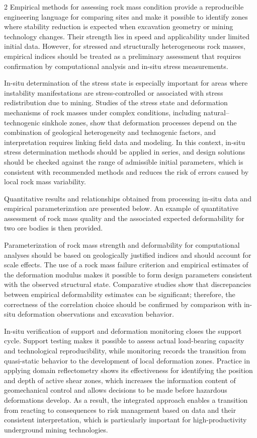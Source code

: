 \begin{multicols}{2}
Empirical methods for assessing rock mass condition provide a
reproducible engineering language for comparing sites and make it
possible to identify zones where stability reduction is expected when
excavation geometry or mining technology changes. Their strength lies in
speed and applicability under limited initial data. However, for
stressed and structurally heterogeneous rock masses, empirical indices
should be treated as a preliminary assessment that requires confirmation
by computational analysis and in-situ stress measurements.

In-situ determination of the stress state is especially important for
areas where instability manifestations are stress-controlled or
associated with stress redistribution due to mining. Studies of the
stress state and deformation mechanisms of rock masses under complex
conditions, including natural--technogenic sinkhole zones, show that
deformation processes depend on the combination of geological
heterogeneity and technogenic factors, and interpretation requires
linking field data and modeling. In this context, in-situ stress
determination methods should be applied in series, and design solutions
should be checked against the range of admissible initial parameters,
which is consistent with recommended methods and reduces the risk of
errors caused by local rock mass variability.

Quantitative results and relationships obtained from processing in-situ
data and empirical parameterization are presented below. An example of
quantitative assessment of rock mass quality and the associated expected
deformability for two ore bodies is then provided.

Parameterization of rock mass strength and deformability for
computational analyses should be based on geologically justified indices
and should account for scale effects. The use of a rock mass failure
criterion and empirical estimates of the deformation modulus makes it
possible to form design parameters consistent with the observed
structural state. Comparative studies show that discrepancies between
empirical deformability estimates can be significant; therefore, the
correctness of the correlation choice should be confirmed by comparison
with in-situ deformation observations and excavation behavior.

In-situ verification of support and deformation monitoring closes the
support cycle. Support testing makes it possible to assess actual
load-bearing capacity and technological reproducibility, while
monitoring records the transition from quasi-static behavior to the
development of local deformation zones. Practice in applying domain
reflectometry shows its effectiveness for identifying the position and
depth of active shear zones, which increases the information content of
geomechanical control and allows decisions to be made before hazardous
deformations develop. As a result, the integrated approach enables a
transition from reacting to consequences to risk management based on
data and their consistent interpretation, which is particularly
important for high-productivity underground mining technologies.
\end{multicols}

